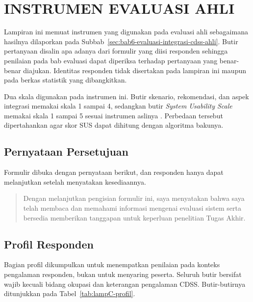 \cleardoublepage
\chapter{INSTRUMEN EVALUASI AHLI}
\label{lamp:instrumen}

Lampiran ini memuat instrumen yang digunakan pada evaluasi ahli sebagaimana hasilnya dilaporkan pada Subbab~\ref{sec:bab6-evaluasi-integrasi-cdss-ahli}. Butir
pertanyaan disalin apa adanya dari formulir yang diisi responden sehingga penilaian pada bab evaluasi dapat diperiksa terhadap pertanyaan yang benar-benar diajukan.
Identitas responden tidak disertakan pada lampiran ini maupun pada berkas statistik yang dibangkitkan.

Dua skala digunakan pada instrumen ini. Butir skenario, rekomendasi, dan aspek integrasi memakai skala 1 sampai 4, sedangkan butir \textit{System Usability Scale}
memakai skala 1 sampai 5 sesuai instrumen aslinya \parencite{brooke1996}. Perbedaan tersebut dipertahankan agar skor SUS dapat dihitung dengan algoritma bakunya.

\section{Pernyataan Persetujuan}
\label{lamp:instrumen-consent}

Formulir dibuka dengan pernyataan berikut, dan responden hanya dapat melanjutkan setelah menyatakan kesediaannya.

\begin{quote}
Dengan melanjutkan pengisian formulir ini, saya menyatakan bahwa saya telah membaca dan memahami informasi mengenai evaluasi sistem serta bersedia memberikan
tanggapan untuk keperluan penelitian Tugas Akhir.
\end{quote}

\section{Profil Responden}
\label{lamp:instrumen-profil}

Bagian profil dikumpulkan untuk menempatkan penilaian pada konteks pengalaman responden, bukan untuk menyaring peserta. Seluruh butir bersifat wajib kecuali
bidang okupasi dan keterangan pengalaman CDSS. Butir-butirnya ditunjukkan pada Tabel~\ref{tab:lampC-profil}.


